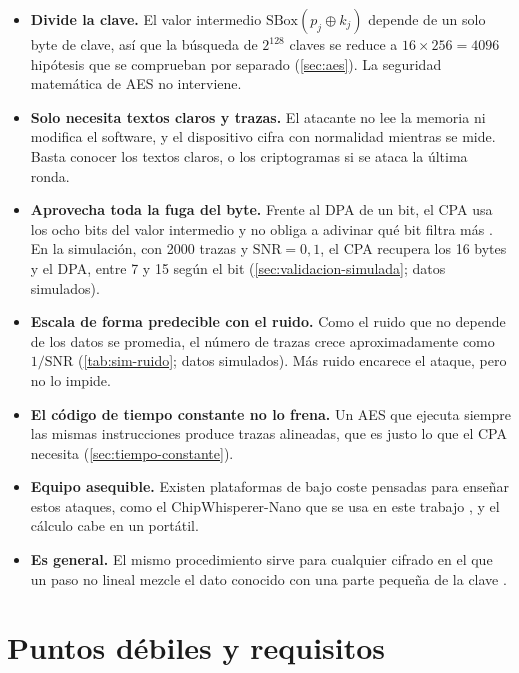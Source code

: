 \begin{itemize}
  \item \textbf{Divide la clave.} El valor intermedio
    $\mathrm{SBox}(p_j \oplus k_j)$ depende de un solo byte de clave, así que
    la búsqueda de $2^{128}$ claves se reduce a $16 \times 256 = 4096$
    hipótesis que se comprueban por separado (\cref{sec:aes}). La seguridad
    matemática de AES no interviene.
  \item \textbf{Solo necesita textos claros y trazas.} El atacante no lee la
    memoria ni modifica el software, y el dispositivo cifra con normalidad
    mientras se mide. Basta conocer los textos claros, o los criptogramas si
    se ataca la última ronda.
  \item \textbf{Aprovecha toda la fuga del byte.} Frente al DPA de un bit, el
    CPA usa los ocho bits del valor intermedio y no obliga a adivinar qué bit
    filtra más \cite{brier2004cpa}. En la simulación, con 2000 trazas y
    $\mathrm{SNR} = 0{,}1$, el CPA recupera los 16 bytes y el DPA, entre 7 y 15
    según el bit (\cref{sec:validacion-simulada}; datos simulados).
  \item \textbf{Escala de forma predecible con el ruido.} Como el ruido que no
    depende de los datos se promedia, el número de trazas crece
    aproximadamente como $1/\mathrm{SNR}$ (\cref{tab:sim-ruido}; datos
    simulados). Más ruido encarece el ataque, pero no lo impide.
  \item \textbf{El código de tiempo constante no lo frena.} Un AES que ejecuta
    siempre las mismas instrucciones produce trazas alineadas, que es justo lo
    que el CPA necesita (\cref{sec:tiempo-constante}).
  \item \textbf{Equipo asequible.} Existen plataformas de bajo coste pensadas
    para enseñar estos ataques, como el ChipWhisperer-Nano que se usa en este
    trabajo \cite{cw-nano-docs}, y el cálculo cabe en un portátil.
  \item \textbf{Es general.} El mismo procedimiento sirve para cualquier
    cifrado en el que un paso no lineal mezcle el dato conocido con una parte
    pequeña de la clave \cite{mangard2007power}.
\end{itemize}

\section{Puntos débiles y requisitos}
\label{sec:puntos-debiles}

